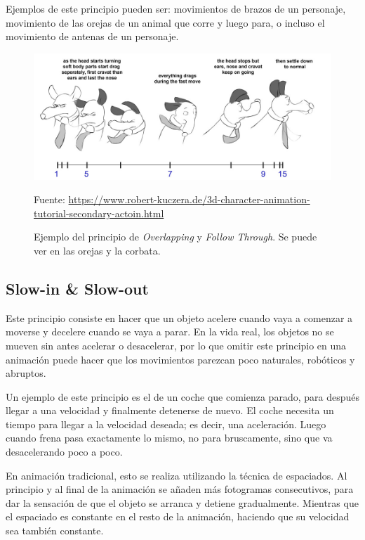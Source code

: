 \documentclass{article}
\begin{document}
\bigskip

Ejemplos de este principio pueden ser: movimientos de brazos de un personaje, movimiento de las orejas de un animal que corre y luego para, o incluso el movimiento de antenas de un personaje.

\begin{figure}[H]
    \centering
    \includegraphics[width=\textwidth]{imagenes/overlap-08.jpg}
    \caption{Ejemplo del principio de \textit{Overlapping} y \textit{Follow Through}. Se puede ver en las orejas y la corbata.}
    \vspace{10pt}
    \footnotesize{Fuente: \url{https://www.robert-kuczera.de/3d-character-animation-tutorial-secondary-actoin.html}}
\end{figure}

\subsection{Slow-in \& Slow-out}

Este principio consiste en hacer que un objeto acelere cuando vaya a comenzar a moverse y decelere cuando se vaya a parar. En la vida real, los objetos no se mueven sin antes acelerar o desacelerar, por lo que omitir este principio en una animación puede hacer que los movimientos parezcan poco naturales, robóticos y abruptos. \cite{plural}

\bigskip

Un ejemplo de este principio es el de un coche que comienza parado, para después llegar a una velocidad y finalmente detenerse de nuevo. El coche necesita un tiempo para llegar a la velocidad deseada; es decir, una aceleración. Luego cuando frena pasa exactamente lo mismo, no para bruscamente, sino que va desacelerando poco a poco. \cite{plural}

\bigskip

En animación tradicional, esto se realiza utilizando la técnica de espaciados. Al principio y al final de la animación se añaden más fotogramas consecutivos, para dar la sensación de que el objeto se arranca y detiene gradualmente. Mientras que el espaciado es constante en el resto de la animación, haciendo que su velocidad sea también constante.
\end{document}
